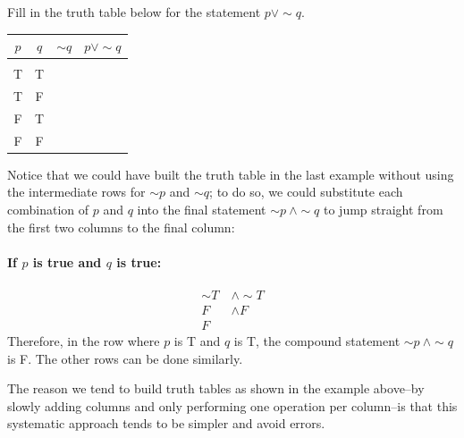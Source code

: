 \begin{try}
Fill in the truth table below for the statement $p \vee \sim q$.
\begin{center}
\begin{tabular}{|c c c c|}
\hline
$p$ & $q$ & $\sim q$ & $p \vee \sim q$\\
\hline
& & &\\
T & T & & \\
T & F & & \\
F & T & & \\
F & F & & \\
\hline
\end{tabular}
\end{center}
\end{try}

Notice that we could have built the truth table in the last example without using the intermediate rows for $\sim p$ and $\sim q$; to do so, we could substitute each combination of $p$ and $q$ into the final statement $\sim p\ \wedge \sim q$ to jump straight from the first two columns to the final column:
\paragraph{If $p$ is true and $q$ is true:}
\begin{align*}
\sim T\ &\wedge \sim T\\
F\ &\wedge F\\
F
\end{align*}
Therefore, in the row where $p$ is T and $q$ is T, the compound statement $\sim p\ \wedge \sim q$ is F.  The other rows can be done similarly.

The reason we tend to build truth tables as shown in the example above--by slowly adding columns and only performing one operation per column--is that this systematic approach tends to be simpler and avoid errors.

